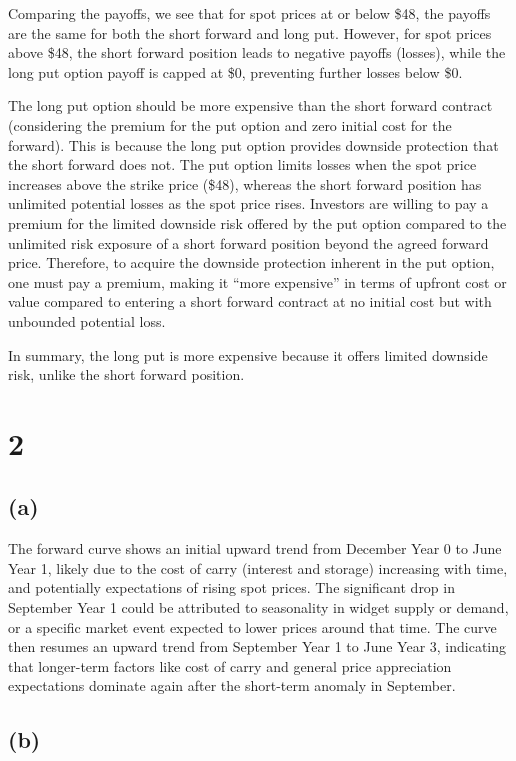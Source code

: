 Comparing the payoffs, we see that for spot prices at or below \$48, the
payoffs are the same for both the short forward and long put. However,
for spot prices above \$48, the short forward position leads to negative
payoffs (losses), while the long put option payoff is capped at \$0,
preventing further losses below \$0.

The long put option should be more expensive than the short forward
contract (considering the premium for the put option and zero initial
cost for the forward). This is because the long put option provides
downside protection that the short forward does not. The put option
limits losses when the spot price increases above the strike price
(\$48), whereas the short forward position has unlimited potential
losses as the spot price rises. Investors are willing to pay a premium
for the limited downside risk offered by the put option compared to the
unlimited risk exposure of a short forward position beyond the agreed
forward price. Therefore, to acquire the downside protection inherent in
the put option, one must pay a premium, making it ``more expensive'' in
terms of upfront cost or value compared to entering a short forward
contract at no initial cost but with unbounded potential loss.

In summary, the long put is more expensive because it offers limited
downside risk, unlike the short forward position.

    \section{2}\label{section}

\subsection{(a)}\label{a}

The forward curve shows an initial upward trend from December Year 0 to
June Year 1, likely due to the cost of carry (interest and storage)
increasing with time, and potentially expectations of rising spot
prices. The significant drop in September Year 1 could be attributed to
seasonality in widget supply or demand, or a specific market event
expected to lower prices around that time. The curve then resumes an
upward trend from September Year 1 to June Year 3, indicating that
longer-term factors like cost of carry and general price appreciation
expectations dominate again after the short-term anomaly in September.

\subsection{(b)}\label{b}

